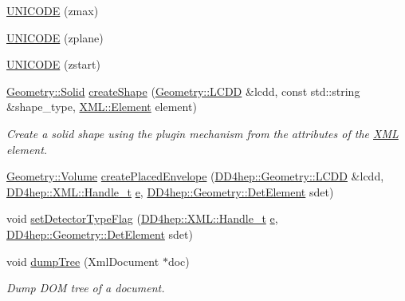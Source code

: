 \begin{DoxyCompactItemize}
\item 
\hyperlink{namespace_d_d4hep_1_1_x_m_l_ac3e72298cb24ad438bc1d8da3809818f}{U\+N\+I\+C\+O\+DE} (zmax)
\item 
\hyperlink{namespace_d_d4hep_1_1_x_m_l_abcce90e734149af85c0b827e5032b948}{U\+N\+I\+C\+O\+DE} (zplane)
\item 
\hyperlink{namespace_d_d4hep_1_1_x_m_l_a6b62c36d475b192d72112297dec6bb5f}{U\+N\+I\+C\+O\+DE} (zstart)
\item 
\hyperlink{namespace_d_d4hep_1_1_geometry_a83de90a8dcc7378ba47d54ef9a6a687b}{Geometry\+::\+Solid} \hyperlink{namespace_d_d4hep_1_1_x_m_l_a8ff2032ce30be011dde0b5696701605f}{create\+Shape} (\hyperlink{class_d_d4hep_1_1_geometry_1_1_l_c_d_d}{Geometry\+::\+L\+C\+DD} \&lcdd, const std\+::string \&shape\+\_\+type, \hyperlink{class_d_d4hep_1_1_x_m_l_1_1_element}{X\+M\+L\+::\+Element} element)
\begin{DoxyCompactList}\small\item\em Create a solid shape using the plugin mechanism from the attributes of the \hyperlink{namespace_d_d4hep_1_1_x_m_l}{X\+ML} element. \end{DoxyCompactList}\item 
\hyperlink{class_d_d4hep_1_1_geometry_1_1_volume}{Geometry\+::\+Volume} \hyperlink{namespace_d_d4hep_1_1_x_m_l_a242bb35f6c983f400a35ef28e873267a}{create\+Placed\+Envelope} (\hyperlink{class_d_d4hep_1_1_geometry_1_1_l_c_d_d}{D\+D4hep\+::\+Geometry\+::\+L\+C\+DD} \&lcdd, \hyperlink{class_d_d4hep_1_1_x_m_l_1_1_handle__t}{D\+D4hep\+::\+X\+M\+L\+::\+Handle\+\_\+t} \hyperlink{_volumes_8cpp_a8a9a1f93e9b09afccaec215310e64142}{e}, \hyperlink{class_d_d4hep_1_1_geometry_1_1_det_element}{D\+D4hep\+::\+Geometry\+::\+Det\+Element} sdet)
\item 
void \hyperlink{namespace_d_d4hep_1_1_x_m_l_ae5c379820b07798a4c0af10b83fd2ad0}{set\+Detector\+Type\+Flag} (\hyperlink{class_d_d4hep_1_1_x_m_l_1_1_handle__t}{D\+D4hep\+::\+X\+M\+L\+::\+Handle\+\_\+t} \hyperlink{_volumes_8cpp_a8a9a1f93e9b09afccaec215310e64142}{e}, \hyperlink{class_d_d4hep_1_1_geometry_1_1_det_element}{D\+D4hep\+::\+Geometry\+::\+Det\+Element} sdet)
\item 
void \hyperlink{namespace_d_d4hep_1_1_x_m_l_a7cf74afac9d5989eb5eb2862e9ae78b3}{dump\+Tree} (Xml\+Document $\ast$doc)
\begin{DoxyCompactList}\small\item\em Dump D\+OM tree of a document. \end{DoxyCompactList}\item 

\end{DoxyCompactItemize}
